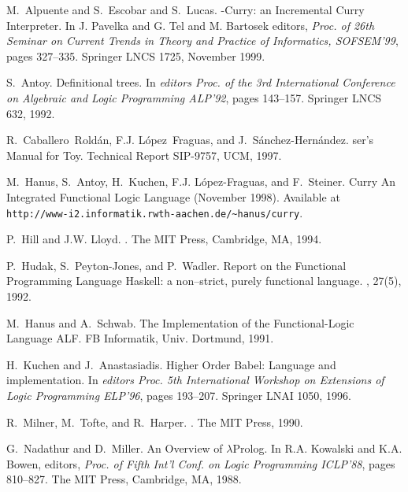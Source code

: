 \documentclass[titlepage,fleqn]{article}
\begin{document}
\newcommand{\etalchar}[1]{$^{#1}$}
\begin{thebibliography}{10}

M.~Alpuente and S.~Escobar and S.~Lucas.
-{C}urry: an {I}ncremental {C}urry {I}nterpreter.
\newblock In J. Pavelka and G. Tel and M. Bartosek editors, {\em Proc. of 26th Seminar on Current Trends in Theory and Practice of Informatics, SOFSEM'99}, pages 327--335. Springer LNCS 1725, November 1999.

S.~Antoy.
\newblock Definitional trees.
\newblock In {\em editors Proc. of the 3rd International Conference on
  Algebraic and Logic Programming ALP'92}, pages 143--157. Springer LNCS 632,
  1992.

R.~Caballero~Rold\'an, F.J. L\'opez~Fraguas, and J.~S\'anchez-Hern\'andez.
ser's {M}anual for {T}oy.
\newblock Technical Report SIP-9757, UCM, 1997.

M.~Hanus, S.~Antoy, H.~Kuchen, F.J. L\'opez-Fraguas, and F.~Steiner.
\newblock Curry {A}n {I}ntegrated {F}unctional {L}ogic {L}anguage ({N}ovember
  1998).
\newblock Available at
  \verb+http://www-i2.informatik.rwth-aachen.de/~hanus/curry+.%

P.~Hill and J.W. Lloyd.
.
\newblock The MIT Press, Cambridge, MA, 1994.

P.~Hudak, S.~Peyton-Jones, and P.~Wadler.
\newblock Report on the {F}unctional {P}rogramming {L}anguage {H}askell: a
  non--strict, purely functional language.
, 27(5), 1992.

M.~Hanus and A.~Schwab.
\newblock The {I}mplementation of the {F}unctional-{L}ogic {L}anguage {ALF}.
\newblock FB Informatik, Univ. Dortmund, 1991.

H.~Kuchen and J.~Anastasiadis.
\newblock Higher {O}rder {B}abel: Language and implementation.
\newblock In {\em editors Proc. 5th International Workshop on Extensions of
  Logic Programming ELP'96}, pages 193--207. Springer LNAI 1050, 1996.

R.~Milner, M.~Tofte, and R.~Harper.
.
\newblock The MIT Press, 1990.

G.~Nadathur and D.~Miller.
\newblock An {O}verview of $\lambda${P}rolog.
\newblock In R.A. Kowalski and K.A. Bowen, editors, {\em Proc. of Fifth Int'l
  Conf. on Logic Programming ICLP'88}, pages 810--827. The MIT Press,
  Cambridge, MA, 1988.

\end{thebibliography}
\end{document}
